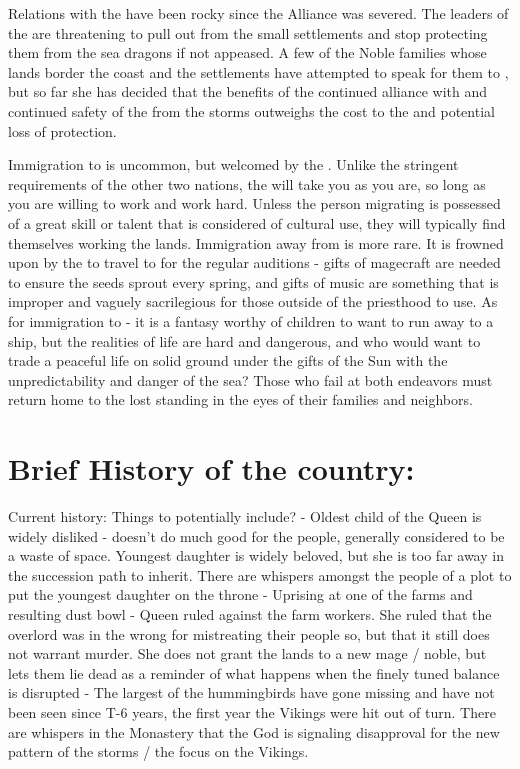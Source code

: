 \documentclass[blue]{GL2020}
\begin{document}
Relations with the \pVikings{} have been rocky since the Alliance was severed.  The leaders of the \pVikings{} are threatening to pull out from the small settlements and stop protecting them from the sea dragons if not appeased.  A few of the Noble families whose lands border the coast and the \pVikings{} settlements have attempted to speak for them to \cQueen{}, but so far she has decided that the benefits of the continued alliance with \pCreators{} and continued safety of the \pSunCh{} from the storms outweighs the cost to the \pVikings{} and potential loss of protection.

Immigration to \pSun{} is uncommon, but welcomed by the \pSunCh{}.  Unlike the stringent requirements of the other two nations, the \pSunCh{} will take you as you are, so long as you are willing to work and work hard.  Unless the person migrating is possessed of a great skill or talent that is considered of cultural use, they will typically find themselves working the lands.  Immigration away from \pSun{} is more rare.  It is frowned upon by the \pSunCh{} to travel to \pCreators{} for the regular auditions - gifts of magecraft are needed to ensure the seeds sprout every spring, and gifts of music are something that is improper and vaguely sacrilegious for those outside of the priesthood to use.  As for immigration to \pVikings{} - it is a fantasy worthy of children to want to run away to a \pVikings{} ship, but the realities of \pVikings{} life are hard and dangerous, and who would want to trade a peaceful life on solid ground under the gifts of the Sun with the unpredictability and danger of the sea?  Those who fail at both endeavors must return home to the lost standing in the eyes of their families and neighbors.

\section*{Brief History of the country:}

Current history: Things to potentially include?
 - Oldest child of the Queen is widely disliked - doesn't do much good for the people, generally considered to be a waste of space.  Youngest daughter is widely beloved, but she is too far away in the succession path to inherit.  There are whispers amongst the people of a plot to put the youngest daughter on the throne
 - Uprising at one of the farms and resulting dust bowl - Queen ruled against the farm workers.  She ruled that the overlord was in the wrong for mistreating their people so, but that it still does not warrant murder.  She does not grant the lands to a new mage / noble, but lets them lie dead as a reminder of what happens when the finely tuned balance is disrupted
 - The largest of the hummingbirds have gone missing and have not been seen since T-6 years, the first year the Vikings were hit out of turn.  There are whispers in the Monastery that the God is signaling disapproval for the new pattern of the storms / the focus on the Vikings.
\end{document}
